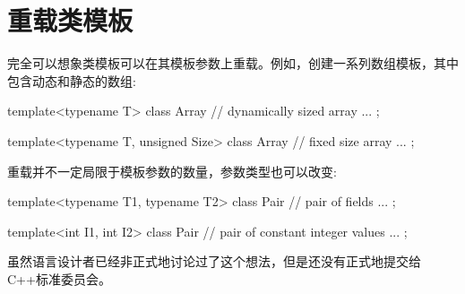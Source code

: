 \section{重载类模板}
完全可以想象类模板可以在其模板参数上重载。例如，创建一系列数组模板，其中包含动态和静态的数组:

\begin{cpp}
template<typename T>
class Array {
	// dynamically sized array
	...
};

template<typename T, unsigned Size>
class Array {
	// fixed size array
	...
};
\end{cpp}

重载并不一定局限于模板参数的数量，参数类型也可以改变:

\begin{cpp}
template<typename T1, typename T2>
class Pair {
	// pair of fields
	...
};

template<int I1, int I2>
class Pair {
	// pair of constant integer values
	...
};
\end{cpp}

虽然语言设计者已经非正式地讨论过了这个想法，但是还没有正式地提交给C++标准委员会。











































